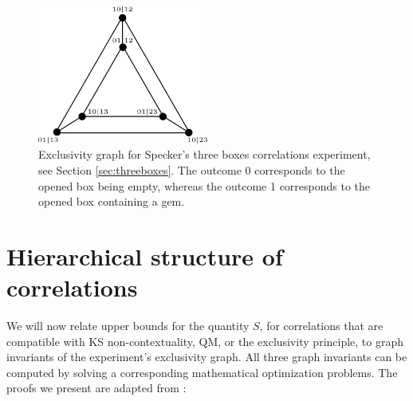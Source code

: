 \begin{figure}
    \centering
    \includegraphics[width=0.5\textwidth]{images/3boxesecl.png}
    \caption{Exclusivity graph for Specker's three boxes correlations experiment, see Section \ref{sec:threeboxes}. The outcome 0 corresponds to the opened box being empty, whereas the outcome 1 corresponds to the opened box containing a gem.}
    \label{fig:3boxesexcl}
\end{figure}

\section{Hierarchical structure of correlations}
\label{sec:cswhierarch}
We will now relate upper bounds for the quantity $S$, for correlations that are compatible with KS non-contextuality, QM, or the exclusivity principle, to graph invariants of the experiment's exclusivity graph. All three graph invariants can be computed by solving a corresponding mathematical optimization problems. The proofs we present are adapted from \cite{Cabello2014}:

